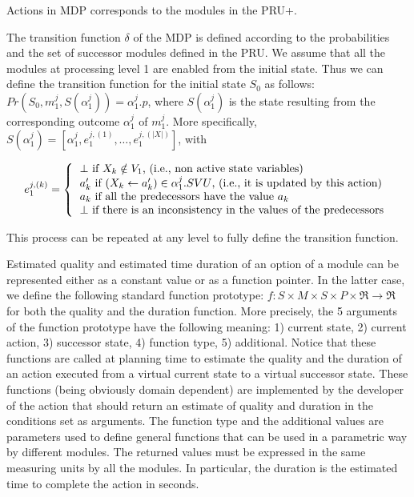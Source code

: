 Actions in MDP corresponds to the modules in the PRU+. 

The transition function $\delta$ of the MDP is defined according to the probabilities and the set of successor modules defined in the PRU.
We assume that all the modules at processing level 1 are enabled from the initial state.
Thus we can define the transition function for the initial state $S_0$ as follows: 
$Pr(S_0,m_1^j,S(\alpha_1^j)) = \alpha_1^j.p$, where
$S(\alpha_1^j)$ is the state resulting from the corresponding outcome $\alpha_1^j$ of $m_1^j$.
More specifically, $S(\alpha_1^j) = [ \alpha_1^j, e_1^{j,(1)}, \ldots, e_1^{j,(|X|)} ]$,
with
 
\[ e_1^{j,(k)} = \left\{ 
\begin{tabular}{l} 
$\bot$ if $X_k \notin V_1$, (i.e., non active state variables) \\  
$a'_k$ if $(X_k \leftarrow a'_k) \in \alpha_1^j.SVU$, (i.e., it is updated by this action) \\
$a_k$  if all the predecessors have the value $a_k$ \\
$\bot$ if there is an inconsistency in the values of the predecessors \\
\end{tabular} \right. \]

This process can be repeated at any level to fully define the transition function.


Estimated quality and estimated time duration of an option of a module can be represented either as a constant value or as a function pointer. In the latter case, we define the following standard function prototype: $f : S \times M \times S \times P \times \Re \rightarrow \Re$ for both the quality and the duration function. More precisely, the 5 arguments of the function prototype have the following meaning: 1) current state, 2) current action, 3) successor state, 4) function type, 5) additional. Notice that these functions are called at planning time to estimate the quality and the duration of an action executed from a virtual current state to a virtual successor state. These functions (being obviously domain dependent) are implemented by the developer of the action that should return an estimate of quality and duration in the  conditions set as arguments. The function type and the additional values are parameters used to define general functions that can be used in a parametric way by different modules.
The returned values must be expressed in the same measuring units by all the modules. In particular, the duration is the estimated time to complete the action in seconds.

